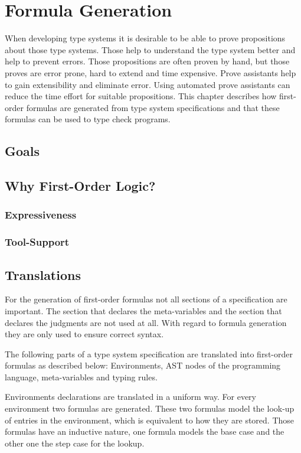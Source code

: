 \chapter{Formula Generation}
\label{ch:formula-generation}
When developing type systems it is desirable to be able to prove
propositions about those type systems. Those help to understand the
type system better and help to prevent errors. Those propositions are
often proven by hand, but those proves are error prone, hard to extend
and time expensive. Prove assistants help to gain extensibility and
eliminate error. Using automated prove assistants can reduce the time
effort for suitable propositions. This chapter describes how
first-order formulas are generated from type system specifications and
that these formulas can be used to type check programs.
 
\section{Goals}
\section{Why First-Order Logic?}
\subsection{Expressiveness}
\subsection{Tool-Support}
\section{Translations}
\label{sec:translations}
For the generation of first-order formulas not all sections of a
specification are important. The section that declares the
meta-variables and the section that declares the judgments are not
used at all. With regard to formula generation they are only used to
ensure correct syntax.

The following parts of a type system specification are translated into
first-order formulas as described below: Environments, AST nodes of
the programming language, meta-variables and typing rules.


Environments declarations are translated in a uniform way. For every
environment two formulas are generated. These two formulas model the
look-up of entries in the environment, which is equivalent to how they
are stored. Those formulas have an inductive nature, one formula
models the base case and the other one the step case for the lookup.

